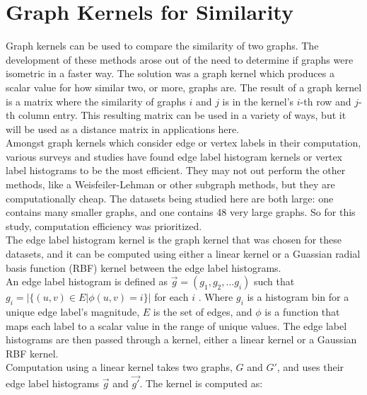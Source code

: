 %
%
%

\section{Graph Kernels for Similarity}

\hspace*{0.3cm} Graph kernels can be used to compare the similarity of two graphs. The development of these methods arose out of the need to determine if graphs were isometric in a faster way. The solution was a graph kernel which produces a scalar value for how similar two, or more, graphs are. The result of a graph kernel is a matrix where the similarity of graphs $i$ and $j$ is in the kernel's $i$-th row and $j$-th column entry. This resulting matrix can be used in a variety of ways, but it will be used as a distance matrix in applications here. \\

Amongst graph kernels which consider edge or vertex labels in their computation, various surveys and studies have found edge label histogram kernels or vertex label histograms to be the most efficient. They may not out perform the other methods, like a Weisfeiler-Lehman or other subgraph methods, but they are computationally cheap. The datasets being studied here are both large: one contains many smaller graphs, and one contains 48 very large graphs. So for this study, computation efficiency was prioritized. \\

The edge label histogram kernel is the graph kernel that was chosen for these datasets, and it can be computed using either a linear kernel or a Guassian radial basis function (RBF) kernel between the edge label histograms. \\
An edge label histogram is defined as $\vec{g} = (g_1,g_2, ... g_i)$ such that $g_i = | \{ (u,v) \in E | \phi(u,v) = i \} |$ for each $i$ \cite{sugiyama2015halting}. Where $g_i$ is a histogram bin for a unique edge label's magnitude, $E$ is the set of edges, and $\phi$ is a function that maps each label to a scalar value in the range of unique values. The edge label histograms are then passed through a kernel, either a linear kernel or a Gaussian RBF kernel.\\
Computation using a linear kernel takes two graphs, $G$ and $G'$, and uses their edge label histograms $\vec{g}$ and $\vec{g'}$. The kernel is computed as:

